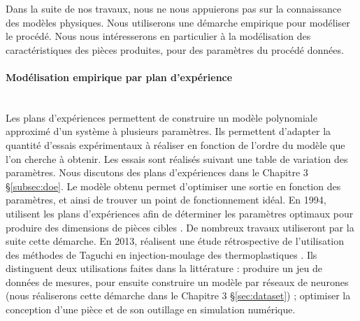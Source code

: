 Dans la suite de nos travaux, nous ne nous appuierons pas sur la connaissance des modèles physiques.
Nous utiliserons une démarche empirique pour modéliser le procédé.
Nous nous intéresserons en particulier à la modélisation des caractéristiques des pièces produites, pour des paramètres du procédé données.

\paragraph{Modélisation empirique par plan d'expérience}\mbox{} \\
Les plans d’expériences permettent de construire un modèle polynomiale approximé d’un système à plusieurs paramètres.
Ils permettent d'adapter la quantité d’essais expérimentaux à réaliser en fonction de l'ordre du modèle que l'on cherche à obtenir.
Les essais sont réalisés suivant une table de variation des paramètres.
Nous discutons des plans d'expériences dans le Chapitre 3 §\ref{subsec:doe}.
Le modèle obtenu permet d'optimiser une sortie en fonction des paramètres, et ainsi de trouver un point de fonctionnement idéal.
En 1994, \citeauthor{blyskal_applying_1994} utilisent les plans d’expériences afin de déterminer les paramètres optimaux pour produire des dimensions de pièces cibles \cite{blyskal_applying_1994}.
De nombreux travaux utiliseront par la suite cette démarche.
En 2013, \citeauthor{fei_practical_2013} réalisent une étude rétrospective de l’utilisation des méthodes de Taguchi en injection-moulage des thermoplastiques \cite{fei_practical_2013}.
Ils distinguent deux utilisations faites dans la littérature : produire un jeu de données de mesures, pour ensuite construire un modèle par réseaux de neurones (nous réaliserons cette démarche dans le Chapitre 3 §\ref{sec:dataset}) ; optimiser la conception d’une pièce et de son outillage en simulation numérique.


